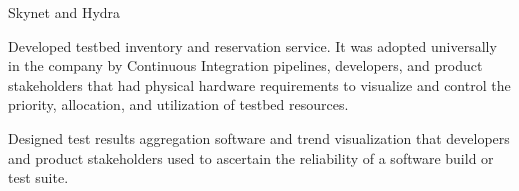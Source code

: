\begin{cventries}
  \cventry
    {} {Skynet and Hydra} {} {} {
      \begin{cvitems} %
        \item {Developed testbed inventory and reservation service. It was adopted universally in the company by Continuous Integration pipelines, developers, and product stakeholders that had physical hardware requirements to visualize and control the priority, allocation, and utilization of testbed resources.}
        \item {Designed test results aggregation software and trend visualization that developers and product stakeholders used to ascertain the reliability of a software build or test suite.}
      \end{cvitems}
    }

\end{cventries}
